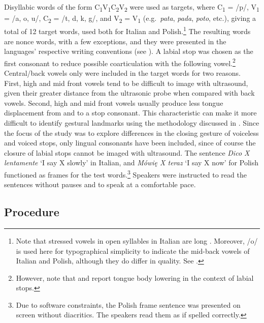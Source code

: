 \documentclass[12pt,]{article}
\let\rmarkdownfootnote\footnote%
\def\footnote{\protect\rmarkdownfootnote}
\begin{document}
Disyllabic words of the form
C\textsubscript{1}V\textsubscript{1}C\textsubscript{2}V\textsubscript{2}
were used as targets, where C\textsubscript{1} = /p/, V\textsubscript{1}
= /a, o, u/, C\textsubscript{2} = /t, d, k, g/, and V\textsubscript{2} =
V\textsubscript{1} (e.g.~\emph{pata}, \emph{pada}, \emph{poto}, etc.),
giving a total of 12 target words, used both for Italian and
Polish.\footnote{Note that stressed vowels in open syllables in Italian are long \citep{renwick2016}. Moreover, /o/ is used here for typographical simplicity to indicate the mid-back vowels of Italian and Polish, although they do differ in quality. See \citet{kramer2009, renwick2016, gussmann2007}.}
The resulting words are nonce words, with a few exceptions, and they
were presented in the languages' respective writing conventions (see
). A labial stop was chosen as the first consonant to
reduce possible coarticulation with the following
vowel.\footnote{However, note that \citet{westbury1983} and \citet{vazquez-alvarez2007} report tongue body lowering in the context of labial stops.}
Central/back vowels only were included in the target words for two
reasons. First, high and mid front vowels tend to be difficult to image
with ultrasound, given their greater distance from the ultrasonic probe
when compared with back vowels. Second, high and mid front vowels
usually produce less tongue displacement from and to a stop consonant.
This characteristic can make it more difficult to identify gestural
landmarks using the methodology discussed in . Since the
focus of the study was to explore differences in the closing gesture of
voiceless and voiced stops, only lingual consonants have been included,
since of course the closure of labial stops cannot be imaged with
ultrasound. The sentence \emph{Dico X lentamente} `I say X slowly' in
Italian, and \emph{Mówię X teraz} `I say X now' for Polish functioned as
frames for the test
words.\footnote{Due to software constraints, the Polish frame sentence was presented on screen without diacritics. The speakers read them as if spelled correctly.}
Speakers were instructed to read the sentences without pauses and to
speak at a comfortable pace.

\hypertarget{procedure}{%
\subsection{Procedure}\label{procedure}}
\end{document}
